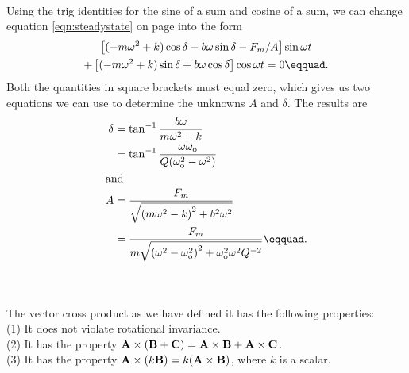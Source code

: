 \noindent{}\label{misc:steadystate}\\
	Using the trig identities for the sine of a sum
	and cosine of a sum, we can change equation \eqref{eqn:steadystate}
	on page \pageref{eqn:steadystate} into the form
	\begin{gather*}
		 \left[(-m\omega^2+k)\cos\delta-b\omega\sin\delta-F_m/A\right]\sin\omega t \\
		+  \left[(-m\omega^2+k)\sin\delta+b\omega\cos\delta\right]\cos\omega t
			= 0\eqquad.
	\end{gather*}
	Both the quantities in square brackets must equal zero, which gives us two
	equations we can use to determine the unknowns $A$ and $\delta$. 
	The results are
	\begin{align*}
		\delta &= \tan^{-1}\frac{b\omega}{m\omega^2-k} \\
			&= \tan^{-1}\frac{\omega\omega_\zu{o}}
					{Q(\omega_\zu{o}^2-\omega^2)} \\
	\intertext{and}
		A &= \frac{F_m}{\sqrt{\left(m\omega^2-k\right)^2+b^2\omega^2}} \\
			&= \frac{F_m}{m\sqrt{\left(\omega^2-\omega_\zu{o}^2\right)^2
				+\omega_\zu{o}^2\omega^2Q^{-2}}}\eqquad.
	\end{align*}
\label{resonance-amplitude}

\noindent{}\label{misc:amproof}\\
\noindent{}\label{misc:uniquexproof}\\
The vector cross product as we have defined it has the
following properties:\\
(1) It does not violate rotational invariance.\\
(2) It has the property $\textbf{A}\times(\textbf{B}+\textbf{C})=\textbf{A}\times\textbf{B}+\textbf{A}\times\textbf{C}$.\\
(3) It has the property $\textbf{A}\times(k\textbf{B})=k(\textbf{A}\times\textbf{B})$, where $k$ is a scalar.


